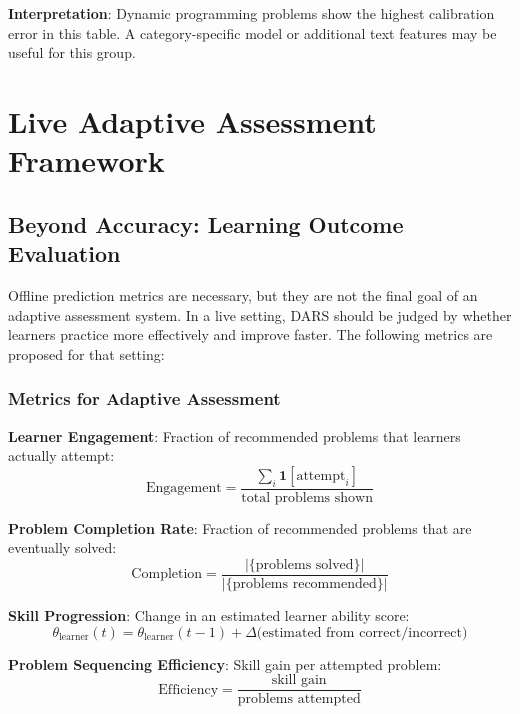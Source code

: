 \documentclass[conference]{IEEEtran}
\begin{document}
\textbf{Interpretation}: Dynamic programming problems show the highest calibration error in this table. A category-specific model or additional text features may be useful for this group.

\section{Live Adaptive Assessment Framework}

\subsection{Beyond Accuracy: Learning Outcome Evaluation}

Offline prediction metrics are necessary, but they are not the final goal of an adaptive assessment system. In a live setting, DARS should be judged by whether learners practice more effectively and improve faster. The following metrics are proposed for that setting:

\subsubsection{Metrics for Adaptive Assessment}

\textbf{Learner Engagement}: Fraction of recommended problems that learners actually attempt:
\begin{equation}
\text{Engagement} = \frac{\sum_i \mathbf{1}[\text{attempt}_i]}{\text{total problems shown}}
\end{equation}

\textbf{Problem Completion Rate}: Fraction of recommended problems that are eventually solved:
\begin{equation}
\text{Completion} = \frac{|\{\text{problems solved}\}|}{|\{\text{problems recommended}\}|}
\end{equation}

\textbf{Skill Progression}: Change in an estimated learner ability score:
\begin{equation}
\theta_{\text{learner}}(t) = \theta_{\text{learner}}(t-1) + \Delta \text{(estimated from correct/incorrect)}
\end{equation}

\textbf{Problem Sequencing Efficiency}: Skill gain per attempted problem:
\begin{equation}
\text{Efficiency} = \frac{\text{skill gain}}{\text{problems attempted}}
\end{equation}
\end{document}
